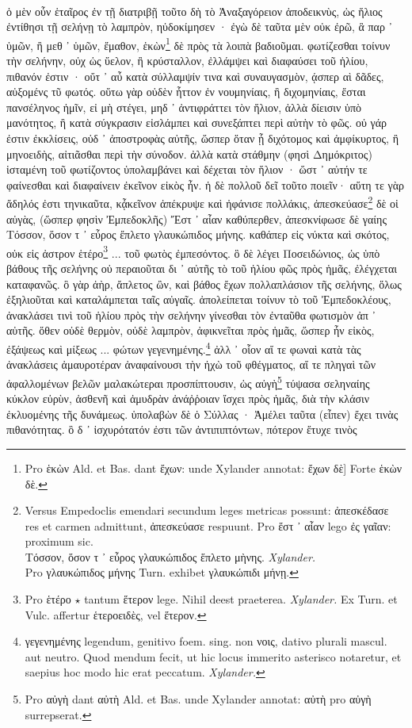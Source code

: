 \documentclass[a4paper, 11pt, oneside, polutonikogreek, german]{article}
\begin{document}
\paragraph{}
ὁ μὲν οὖν ἑταῖρος ἐν τῇ διατριβῇ τοῦτο δὴ τὸ Ἀναξαγόρειον ἀποδεικνὺς, ὡς ἥλιος ἐντίθησι τῇ σελήνῃ τὸ λαμπρὸν, ηὐδοκίμησεν · ἐγὼ δὲ ταῦτα μὲν οὐκ ἐρῶ, ἃ παρ ᾽ ὑμῶν, ἢ μεθ ᾽ ὑμῶν, ἔμαθον, ἑκὼν\footnote{Pro ἑκὼν Ald. et Bas. dant ἔχων: unde Xylander annotat: ἔχων δὲ] Forte ἑκὼν δὲ.} δὲ πρὸς τὰ λοιπὰ βαδιοῦμαι. φωτίζεσθαι τοίνυν τὴν σελήνην, οὐχ ὡς ὕελον, ἢ κρύσταλλον, ἐλλάμψει καὶ διαφαύσει τοῦ ἡλίου, πιθανόν ἐστιν · οὔτ ᾽ αὖ κατὰ σύλλαμψίν τινα καὶ συναυγασμὸν, ᾴσπερ αὶ δᾶδες, αὐξομένς τῦ φωτός. οὕτω γὰρ οὐδὲν ἧττον ἐν νουμηνίαις, ἢ διχομηνίαις, ἔσται πανσέληνος ἡμῖν, εἰ μὴ στέγει, μηδ ᾽ ἀντιφράττει τὸν ἥλιον, ἀλλὰ δίεισιν ὑπὸ μανότητος, ἢ κατὰ σύγκρασιν εἰσλάμπει καὶ συνεξάπτει περὶ αὐτὴν τὸ φῶς. οὐ γάρ ἐστιν ἐκκλίσεις, οὐδ ᾽ ἀποστροφὰς αὐτῆς, ὥσπερ ὅταν ᾖ διχότομος καὶ ἀμφίκυρτος, ἢ μηνοειδὴς, αἰτιᾶσθαι περὶ τὴν σύνοδον. ἀλλὰ κατὰ στάθμην (φησὶ Δημόκριτος) ἱσταμένη τοῦ φωτίζοντος ὑπολαμβάνει καὶ δέχεται τὸν ἥλιον · ὥστ ᾽ αὐτήν τε φαίνεσθαι καὶ διαφαίνειν ἐκεῖνον εἰκὸς ἦν. ἡ δὲ πολλοῦ δεῖ τοῦτο ποιεῖν· αὕτη τε γὰρ ἄδηλός ἐστι τηνικαῦτα, κᾆκεῖνον ἀπέκρυψε καὶ ἠφάνισε πολλάκις, ἀπεσκεύασε\footnote{Versus Empedoclis emendari secundum leges metricas possunt: ἀπεσκέδασε res et carmen admittunt, ἀπεσκεύασε respuunt. Pro ἕστ ᾽ αἶαν lego ἐς γαῖαν: proximum sic.\\\hspace*{5mm}Τόσσον, ὅσον τ ᾽ εὖρος γλαυκώπιδος ἕπλετο μὴνης. \emph{Xylander.}\\\hspace*{5mm}Pro γλαυκώπιδος μήνης Turn. exhibet γλαυκώπιδι μήνῃ.} δὲ οἱ αὐγὰς, (ὥσπερ φησὶν Ἐμπεδοκλῆς) Ἔστ ᾽ αἶαν καθύπερθεν, ἀπεσκνίφωσε δὲ γαίης Τόσσον, ὅσον τ ᾽ εὖρος ἔπλετο γλαυκώπιδος μήνης. καθάπερ εἰς νύκτα καὶ σκότος, οὐκ εἰς ἀστρον ἑτέρο\footnote{Pro ἑτέρο $\star$ tantum ἕτερον lege. Nihil deest praeterea. \emph{Xylander.} Ex Turn. et Vulc. affertur ἑτεροειδὲς, vel ἕτερον.} ... τοῦ φωτὸς ἐμπεσόντος. ὃ δὲ λέγει Ποσειδώνιος, ὡς ὑπὸ βάθους τῆς σελήνης οὐ περαιοῦται δι ᾽ αὐτῆς τὸ τοῦ ἡλίου φῶς πρὸς ἡμᾶς, ἐλέγχεται καταφανῶς. ὃ γὰρ ἀὴρ, ἄπλετος ὢν, καὶ βάθος ἔχων πολλαπλάσιον τῆς σελήνης, ὅλως ἐξηλιοῦται καὶ καταλάμπεται ταῖς αὐγαῖς. ἀπολείπεται τοίνυν τὸ τοῦ Ἐμπεδοκλέους, ἀνακλάσει τινὶ τοῦ ἡλίου πρὸς τὴν σελήνην γίνεσθαι τὸν ἐνταῦθα φωτισμὸν ἀπ ᾽ αὐτῆς. ὅθεν οὐδὲ θερμὸν, οὐδὲ λαμπρὸν, ἀφικνεῖται πρὸς ἡμᾶς, ὥσπερ ἦν εἰκὸς, ἐξάψεως καὶ μίξεως ... φώτων γεγενημένης.\footnote{γεγενημένης legendum, genitivo foem. sing. non νοις, dativo plurali mascul. aut neutro. Quod mendum fecit, ut hic locus immerito asterisco notaretur, et saepius hoc modo hic erat peccatum. \emph{Xylander.}} ἀλλ ᾽ οἷον αἵ τε φωναὶ κατὰ τὰς ἀνακλάσεις ἀμαυροτέραν ἀναφαίνουσι τὴν ἠχὼ τοῦ φθέγματος, αἵ τε πληγαὶ τῶν ἀφαλλομένων βελῶν μαλακώτεραι προσπίπτουσιν, ὡς αὐγὴ\footnote{Pro αὐγὴ dant αὐτὴ Ald. et Bas. unde Xylander annotat: αὐτὴ pro αὐγὴ surrepserat.} τύψασα σεληναίης κύκλον εὐρὺν, ἀσθενῆ καὶ ἀμυδρὰν ἀνάῤῥοιαν ἴσχει πρὸς ἡμᾶς, διὰ τὴν κλάσιν ἐκλυομένης τῆς δυνάμεως. ὑπολαβὼν δὲ ὁ Σύλλας · Ἀμέλει ταῦτα (εἶπεν) ἔχει τινὰς πιθανότητας. ὃ δ ᾽ ἰσχυρότατόν ἐστι τῶν ἀντιπιπτόντων, πότερον ἔτυχε τινὸς 
\end{document}
